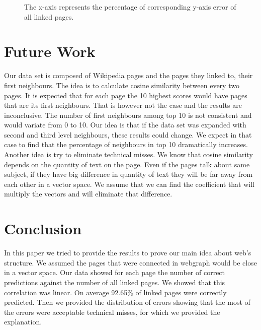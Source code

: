\documentclass{article}
\newcommand\boxplotbignum{1000000}
\begin{document}
\begin{figure}[H]
  \caption{The x-axis represents the percentage of corresponding y-axis error of all linked pages.}
\end{figure}

\section{Future Work}
Our data set is composed of Wikipedia pages and the pages they linked to, their first neighbours. The idea is to calculate cosine similarity between every two pages. It is expected that for each page the 10 highest scores would have pages that are its first neighbours. That is however not the case and the results are inconclusive. The number of first neighbours among top 10 is not consistent and would variate from 0 to 10. \newline
Our idea is that if the data set was expanded with second and third level neighbours, these results could change. We expect in that case to find that the percentage of neighbours in top 10 dramatically increases.\newline
Another idea is try to eliminate technical misses. We know that cosine similarity depends on the quantity of text on the page. Even if the pages talk about same subject, if they have big difference in quantity of text they will be far away from each other in a vector space. We assume that we can find the coefficient that will multiply the vectors and will eliminate that difference. 
\section{Conclusion}
In this paper we tried to provide the results to prove our main idea about web's structure. We assumed the pages that were connected in webgraph would be close in a vector space. Our data showed for each page the number of correct predictions against the number of all linked pages. We showed that this correlation was linear. On average 92.65\% of linked pages were correctly predicted. Then we provided the distribution of errors showing that the most of the errors were acceptable technical misses, for which we provided the explanation. 
\end{document}
